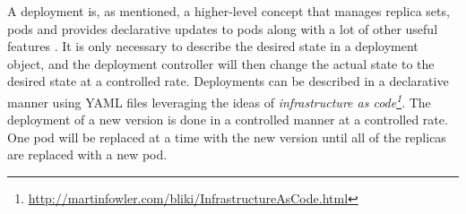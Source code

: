 \noindent
A deployment is, as mentioned, a higher-level concept that manages replica sets, pods and provides declarative updates to pods along with a lot of other useful features \cite{kubernetesio}. It is only necessary to describe the desired state in a deployment object, and the deployment controller will then change the actual state to the desired state at a controlled rate. Deployments can be described in a declarative manner using YAML files leveraging the ideas of \textit{infrastructure as code\footnote{\url{http://martinfowler.com/bliki/InfrastructureAsCode.html}}}. The deployment of a new version is done in a controlled manner at a controlled rate. One pod will be replaced at a time with the new version until all of the replicas are replaced with a new pod.